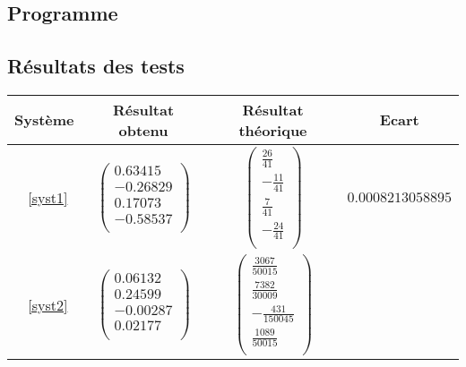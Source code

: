 \documentclass{report}
\begin{document}
      \subsection{Programme}
        
      \newpage
      \subsection{Résultats des tests}
      	\renewcommand{\arraystretch}{2}
        \begin{tabular}{|c|c|c|c|}
          \hline
          Système & Résultat obtenu & Résultat théorique & Ecart \\ %
          \hline
          ~\eqref{syst1}
          &
          $\begin{pmatrix}
              0.63415 \\
              -0.26829 \\
              0.17073 \\
              -0.58537 \\
           \end{pmatrix}$
          &
          $\begin{pmatrix}
              \frac{26}{41} \\
              -\frac{11}{41} \\
              \frac{7}{41} \\
              -\frac{24}{41} \\
          \end{pmatrix}$
          &
          $0.0008213058895$\\
          \hline
          ~\eqref{syst2}
          &
          $\begin{pmatrix}
              0.06132 \\
              0.24599 \\
              -0.00287 \\
              0.02177 \\
           \end{pmatrix}$
          &
          $\begin{pmatrix}
              \frac{3067}{50015} \\
              \frac{7382}{30009} \\
              -\frac{431}{150045} \\
              \frac{1089}{50015} \\
          \end{pmatrix}$

\end{tabular}
\end{document}
